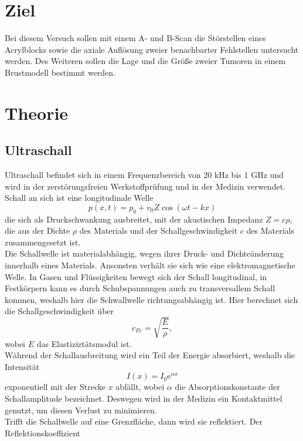 \section{Ziel}
Bei diesem Versuch sollen mit einem A- und B-Scan die Störstellen eines Acrylblocks sowie die axiale Auflösung zweier benachbarter Fehlstellen untersucht werden. Des Weiteren sollen die Lage und die Größe zweier Tumoren in einem Brustmodell bestimmt werden. 

\section{Theorie}
\label{sec:Theorie}
\subsection{Ultraschall}
Ultraschall befindet sich in einem Frequenzbereich von 20 kHz bis 1 GHz und wird in der zerstörungsfreien Werkstoffprüfung und in der Medizin verwendet. Schall an sich ist eine longitudinale Welle
\begin{equation*}
  p(x,t)=p_0+v_0 Z \cos(\omega t-kx)
\end{equation*}
die sich als Druckschwankung ausbreitet, mit der akustischen Impedanz $Z=c\rho$, die aus der Dichte $\rho$ des Materials und der Schallgeschwindigkeit $c$ des Materials zusammengesetzt ist. \\
\noindent Die Schallwelle ist materialabhängig, wegen ihrer Druck- und Dichteänderung innerhalb eines Materials. Ansonsten verhält sie sich wie eine elektromagnetische Welle. In Gasen und Flüssigkeiten bewegt sich der Schall longitudinal, in Festkörpern kann es durch Schubspannungen auch zu transversallem Schall kommen, weshalb hier die Schwallwelle richtungsabhängig ist. Hier berechnet sich die Schallgeschwindigkeit über
\begin{equation*}
  c_{Fe}=\sqrt{\frac{E}{\rho}},
\end{equation*}
wobei $E$ das Elastiziztätsmodul ist.\\
Während der Schallausbreitung wird ein Teil der Energie absorbiert, weshalb die Intensität
\begin{equation*}
  I(x)=I_0 \textrm{e}^{\alpha x}
\end{equation*} 
exponentiell mit der Strecke $x$ abfällt, wobei $\alpha$ die Absorptionskonstante der Schallamplitude bezeichnet. Deswegen wird in der Medizin ein Kontaktmittel genutzt, um diesen Verlust zu minimieren.\\
Trifft die Schallwelle auf eine Grenzfläche, dann wird sie reflektiert. Der Reflektionskoeffizient
